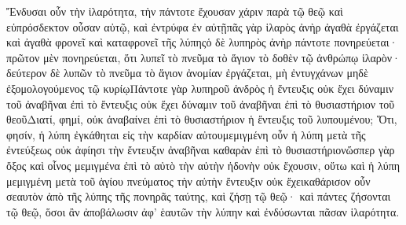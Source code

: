 Ἔνδυσαι οὖν τὴν ἱλαρότητα, τὴν πάντοτε ἔχουσαν χάριν παρὰ τῷ θεῷ καὶ εὐπρόσδεκτον οὖσαν αὐτῷ, καὶ ἐντρύφα ἐν αὐτῇπᾶς γὰρ ἱλαρὸς ἀνὴρ ἀγαθὰ ἐργάζεται καὶ ἀγαθὰ φρονεῖ καὶ καταφρονεῖ τῆς λύπηςὁ δὲ λυπηρὸς ἀνὴρ πάντοτε πονηρεύεται· πρῶτον μὲν πονηρεύεται, ὅτι λυπεῖ τὸ πνεῦμα τὸ ἅγιον τὸ δοθὲν τῷ ἀνθρώπῳ ἱλαρὸν· δεύτερον δὲ λυπῶν τὸ πνεῦμα τὸ ἅγιον ἀνομίαν ἐργάζεται, μὴ ἐντυγχάνων μηδὲ ἐξομολογούμενος τῷ κυρίῳΠάντοτε γὰρ λυπηροῦ ἀνδρὸς ἡ ἔντευξις οὐκ ἔχει δύναμιν τοῦ ἀναβῆναι ἐπὶ τὸ ἔντευξις οὐκ ἔχει δύναμιν τοῦ ἀναβῆναι ἐπὶ τὸ θυσιαστήριον τοῦ θεοῦΔιατί, φημί, οὐκ ἀναβαίνει ἐπὶ τὸ θυσιαστήριον ἡ ἔντευξις τοῦ λυπουμένου; Ὅτι, φησίν, ἡ λύπη ἐγκάθηται εἰς τὴν καρδίαν αὐτουμεμιγμένη οὖν ἡ λύπη μετὰ τῆς ἐντεύξεως οὐκ ἀφίησι τὴν ἔντευξιν ἀναβῆναι καθαρὰν ἐπὶ τὸ θυσιαστήριονὥσπερ γὰρ ὄξος καὶ οἶνος μεμιγμένα ἐπὶ τὸ αὐτὸ τὴν αὐτὴν ἡδονὴν οὐκ ἔχουσιν, οὕτω καὶ ἡ λύπη μεμιγμένη μετὰ τοῦ ἁγίου πνεύματος τὴν αὐτὴν ἔντευξιν οὐκ ἔχεικαθάρισον οὖν σεαυτὸν ἀπὸ τῆς λύπης τῆς πονηρᾶς ταύτης, καὶ ζήσῃ τῷ θεῷ· καὶ πάντες ζήσονται τῷ θεῷ, ὅσοι ἂν ἀποβάλωσιν ἀφ’ ἑαυτῶν τὴν λύπην καὶ ἐνδύσωνται πᾶσαν ἱλαρότητα.

